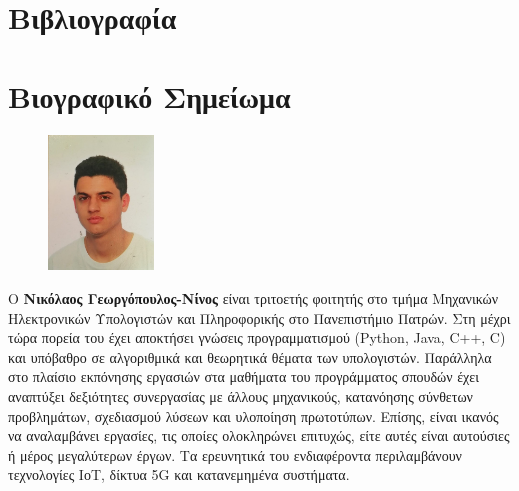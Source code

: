 \documentclass[11pt]{article}
\begin{document}
	\section*{Βιβλιογραφία}
	
	
	
	
	
	
	\newpage
	\section*{Βιογραφικό Σημείωμα}
	
	
	\begin{figure}
		\centering
		\includegraphics[width=0.25\textwidth]{PicProfil}
	\end{figure}
	Ο \textbf{Νικόλαος Γεωργόπουλος-Νίνος} είναι τριτοετής φοιτητής στο τμήμα Μηχανικών Ηλεκτρονικών Υπολογιστών και Πληροφορικής στο Πανεπιστήμιο Πατρών. Στη μέχρι τώρα πορεία του έχει αποκτήσει γνώσεις προγραμματισμού (\foreignlanguage{english}{Python, Java, C++, C}) και υπόβαθρο σε αλγοριθμικά και θεωρητικά θέματα των υπολογιστών. Παράλληλα στο πλαίσιο εκπόνησης εργασιών στα μαθήματα του προγράμματος σπουδών έχει αναπτύξει δεξιότητες συνεργασίας με άλλους μηχανικούς, κατανόησης σύνθετων προβλημάτων, σχεδιασμού λύσεων και υλοποίηση πρωτοτύπων. Επίσης, είναι ικανός να αναλαμβάνει εργασίες, τις οποίες ολοκληρώνει επιτυχώς, είτε αυτές είναι αυτούσιες ή μέρος μεγαλύτερων έργων. Τα ερευνητικά του ενδιαφέροντα περιλαμβάνουν τεχνολογίες ΙοΤ, δίκτυα \foreignlanguage{english}{5G} και κατανεμημένα συστήματα.
	
\end{document}
